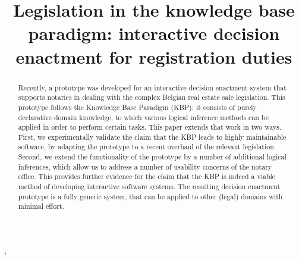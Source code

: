 \documentclass{IOS-Book-Article}
\begin{document}
\newcommand{\Iota}{I}
\newcommand{\Marjolein}[1]{ \namedcomment{#1}{Marjolein}{OliveGreen}}
\newcommand{\jve}[1]{ \namedcomment{#1}{Joost}{blue}}
\renewcommand{\true}{\mathbf{t}}
\renewcommand{\false}{\mathbf{f}}
\newcommand{\unknown}{\mathbf{u}}
\newcommand{\ides}{IDES}

\begin{frontmatter}          %
%
\title{Legislation in the knowledge base paradigm: interactive decision enactment for registration duties}
\runningtitle{}

%
\author[A]{ },
\author[B]{ }
\author[C]{ }
\author[A]{ }
\address[A]{Department of Computer Science, KU Leuven, Campus De Nayer, Sint-Katelijne-Waver, Belgium}
\address[B]{KTH Royal Institute of Technology, Stockholm, Sweden}
\address[C]{Department of Computer Science, KU Leuven, Leuven, Belgium}
%
\begin{abstract}
Recently, a prototype was developed for an interactive decision enactment system that supports notaries in dealing with the complex Belgian real estate sale legislation. This prototype follows the Knowledge Base Paradigm (KBP): it consists of purely declarative domain knowledge, to which various logical inference methods can be applied in order to perform certain tasks. This paper extends that work in two ways. First, we experimentally  validate the claim that the KBP leads to highly maintainable software, by adapting the prototype to a recent overhaul of the relevant legislation. Second, we extend the functionality of the prototype by a number of additional logical inferences, which allow us to address a number of usability concerns of the notary office. This provides further evidence for the claim that the KBP is indeed a viable method of developing interactive software systems. The resulting decision enactment prototype is a fully generic system, that can be applied to other (legal) domains with minimal effort.

\end{abstract}
\end{frontmatter}
\end{document}

